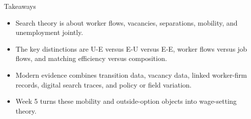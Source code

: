 \documentclass[aspectratio=169,11pt]{beamer}
\begin{document}
\begin{frame}{Takeaways}
\begin{itemize}
    \item Search theory is about worker flows, vacancies, separations, mobility, and unemployment jointly.
    \item The key distinctions are U-E versus E-U versus E-E, worker flows versus job flows, and matching efficiency versus composition.
    \item Modern evidence combines transition data, vacancy data, linked worker-firm records, digital search traces, and policy or field variation.
    \item Week 5 turns these mobility and outside-option objects into wage-setting theory.
\end{itemize}
\end{frame}
\end{document}
